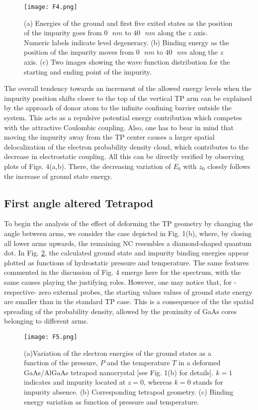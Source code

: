 \documentclass[nanomaterials,article,submit,moreauthors,pdftex]{Definitions/mdpi}
\begin{document}
\begin{figure}[H]
    \centering
    \texttt{[image: F4.png]}
    \caption{(a) Energies of the ground and first five exited states as the position of the impurity goes from $0\text{ }nm$ to $40\text{ }nm$ along the $z$ axis. Numeric labels indicate level degeneracy. (b) Binding energy as the position of the impurity moves from $0\text{ }nm$ to $40\text{ }nm$ along the $z$ axis. (c) Two images showing the wave function distribution for the starting and ending point of the impurity.}
	\label{F4}
\end{figure}

The overall tendency towards an increment of the allowed energy levels when the impurity position shifts closer to the top of the vertical TP arm can be explained by the approach of donor atom to the infinite confining barrier outside the system. This acts as a repulsive potential energy contribution which competes with the attractive Coulombic coupling. Also, one has to bear in mind that moving the impurity away from the TP center causes a larger spatial delocalization of the electron probability density cloud, which contributes to the decrease in electrostatic coupling. All this can be directly verified by observing plots of Figs. 4(a,b). There, the decreasing variation of $E_b$ with $z_0$ closely follows the increase of ground state energy.

\subsection{First angle altered Tetrapod}

To begin the analysis of the effect of deforming the TP geometry by changing the angle between arms, we consider the case depicted in Fig. 1(b), where, by closing all lower arms upwards, the remaining NC resembles a diamond-shaped quantum dot. In Fig. \ref{F5}, the calculated ground state and impurity binding energies appear plotted as functions of hydrostatic pressure and temperature. The same features commented in the discussion of Fig. 4 emerge here for the spectrum, with the same causes playing the justifying roles. However, one may notice that, for 
-respective- zero external probes, the starting values values of ground state energy are smaller than in the standard TP case. This is a consequence of the the spatial spreading of the probability density, allowed by the proximity of GaAs cores belonging to different arms.

\begin{figure}[H]
    \centering
    \texttt{[image: F5.png]}
    \caption{(a)Variation of the electron energies of the ground states as a function of the pressure, $P$ and the temperature $T$ in a deformed GaAs/AlGaAs tetrapod nanocrystal [see Fig. 1(b) for details]. $k=1$ indicates and impurity located at $z=0$, whereas $k=0$ stands for impurity absence. (b) Corresponding tetrapod geometry. (c) Binding energy variation as function of pressure and temperature.}
	\label{F5}
\end{figure}
\end{document}
